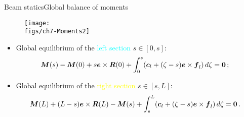 \begin{frame}{Beam statics}{Global balance of moments}

\begin{figure}
\centering\texttt{[image: \\figs/ch7-Moments2]}
\end{figure}

\begin{itemize}
\item Global equilibrium of the \textcolor{aqua}{left section} $s\in[0,s]$:
\begin{displaymath}
\!\!\!\!{\boldsymbol{M}}(s)-{\boldsymbol{M}}(0)+s{\boldsymbol{e}}\times{\boldsymbol{R}}(0)+\int_0^s({\boldsymbol{c}}_l+(\zeta-s){\boldsymbol{e}}\times{\boldsymbol{f}}_l)\,d \zeta={\bf 0}\,;
\end{displaymath}
\item  Global equilibrium of the \textcolor{yellow}{right section} $s\in[s,L]$:
\begin{displaymath}
\!\!\!\!{\boldsymbol{M}}(L)+(L-s){\boldsymbol{e}}\times{\boldsymbol{R}}(L)-{\boldsymbol{M}}(s)+\int_s^L({\boldsymbol{c}}_l+(\zeta-s){\boldsymbol{e}}\times{\boldsymbol{f}}_l)\,d \zeta={\bf 0}\,.
\end{displaymath}
\end{itemize}

\end{frame}

